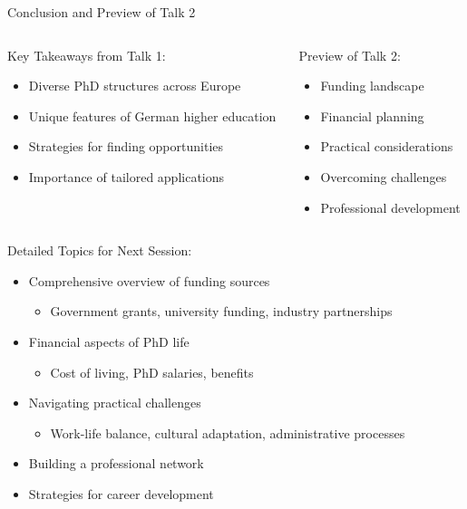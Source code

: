 \documentclass[10pt]{beamer}
\begin{document}
\begin{frame}[fragile]{Conclusion and Preview of Talk 2}
\begin{columns}[T]
    \begin{column}{0.5\textwidth}
        \alert{Key Takeaways from Talk 1:}
        \begin{itemize}
            \item Diverse PhD structures across Europe
            \item Unique features of German higher education
            \item Strategies for finding opportunities
            \item Importance of tailored applications
        \end{itemize}
    \end{column}
    \begin{column}{0.5\textwidth}
        \alert{Preview of Talk 2:}
        \begin{itemize}
            \item Funding landscape
            \item Financial planning
            \item Practical considerations
            \item Overcoming challenges
            \item Professional development
        \end{itemize}
    \end{column}
\end{columns}

\vspace{0.5cm}
\alert{Detailed Topics for Next Session:}
\begin{itemize}
    \item Comprehensive overview of funding sources
        \begin{itemize}
            \item Government grants, university funding, industry partnerships
        \end{itemize}
    \item Financial aspects of PhD life
        \begin{itemize}
            \item Cost of living, PhD salaries, benefits
        \end{itemize}
    \item Navigating practical challenges
        \begin{itemize}
            \item Work-life balance, cultural adaptation, administrative processes
        \end{itemize}
    \item Building a professional network
    \item Strategies for career development
\end{itemize}

\vspace{0.3cm}
\end{frame}
\end{document}
